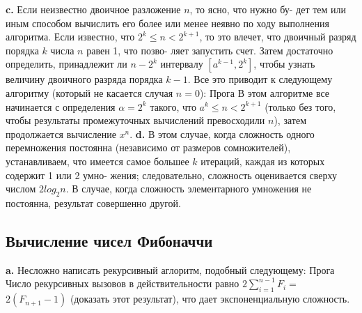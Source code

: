 \documentclass{mai_book}
\begin{document}
\textbf{c.} Если неизвестно двоичное разложение $n$, то ясно, что нужно бу-
дет тем или иным способом вычислить его более или менее неявно по
ходу выполнения алгоритма. Если известно, что $2^k \leq n < 2^{k+1}$, то это
влечет, что двоичный разряд порядка $k$ числа $n$ равен 1, что позво-
ляет запустить счет. Затем достаточно определить, принадлежит ли
$n-2^k$ интервалу $[a^{k-1},2^k]$, чтобы узнать величину двоичного разряда
порядка $k-1$. Все это приводит к следующему алгоритму (который не
касается случая $n=0$):\newline
Прога\newline
В этом алгоритме все начинается с определения $\alpha=2^k$ такого, что
$a^k \leq n < 2^{k+1}$ (только без того, чтобы результаты промежуточных
вычислений превосходили $n$), затем продолжается вычисление $x^n$.\newline
\hspace*{15pt}\textbf{d.} В этом случае, когда сложность одного перемножения постоянна
(независимо от размеров сомножителей), устанавливаем, что имеется
самое большее $k$ итераций, каждая из которых содержит 1 или 2 умно-
жения; следовательно, сложность оценивается сверху числом $2log_2n$.\newline
\hspace*{15pt}В случае, когда сложность элементарного умножения не постоянна, результат совершенно другой.

\subsection{Вычисление чисел Фибоначчи}
\hspace*{15pt}\textbf{a.} Несложно написать рекурсивный аглоритм, подобный следующему:\newline
Прога\newline
\hspace*{15pt}Число рекурсивных вызовов в действительности равно $2\sum_{i=1}^{n-1}F_i=$
$2(F_{n+1}-1)$ (доказать этот результат), что дает экспоненциальную
сложность.\newpage
\end{document}

